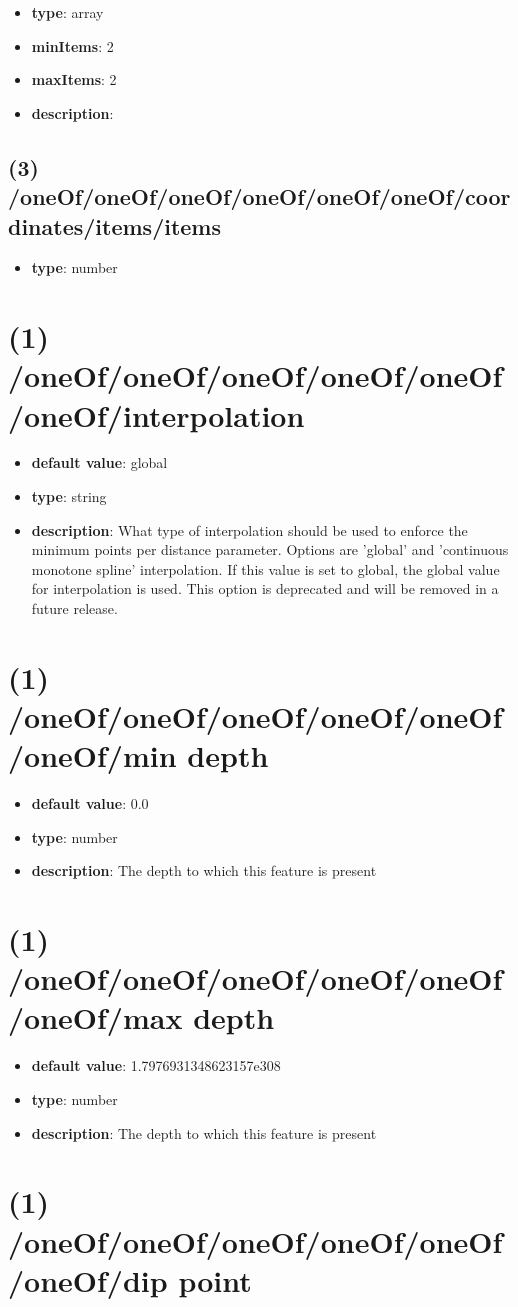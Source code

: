 \begin{itemize}[leftmargin=2em]\item {\bf type}: array
\item {\bf minItems}: 2
\item {\bf maxItems}: 2
\item {\bf description}: 
\end{itemize}\subsection{(3) /oneOf/oneOf/oneOf/oneOf/oneOf/oneOf/coordinates/items/items}
\begin{itemize}[leftmargin=3em]\item {\bf type}: number
\end{itemize}\section{(1) /oneOf/oneOf/oneOf/oneOf/oneOf/oneOf/interpolation}
\begin{itemize}[leftmargin=1em]\item {\bf default value}: global
\item {\bf type}: string
\item {\bf description}: What type of interpolation should be used to enforce the minimum points per distance parameter. Options are 'global' and 'continuous monotone spline' interpolation. If this value is set to global, the global value for interpolation is used. This option is deprecated and will be removed in a future release.
\end{itemize}\section{(1) /oneOf/oneOf/oneOf/oneOf/oneOf/oneOf/min depth}
\begin{itemize}[leftmargin=1em]\item {\bf default value}: 0.0
\item {\bf type}: number
\item {\bf description}: The depth to which this feature is present
\end{itemize}\section{(1) /oneOf/oneOf/oneOf/oneOf/oneOf/oneOf/max depth}
\begin{itemize}[leftmargin=1em]\item {\bf default value}: 1.7976931348623157e308
\item {\bf type}: number
\item {\bf description}: The depth to which this feature is present
\end{itemize}\section{(1) /oneOf/oneOf/oneOf/oneOf/oneOf/oneOf/dip point}

